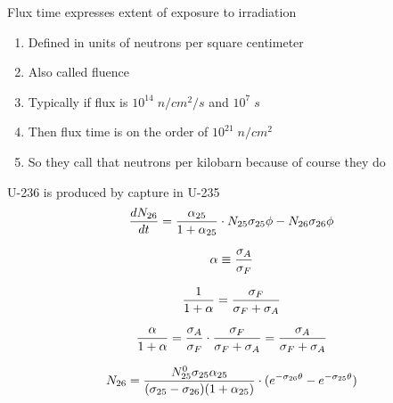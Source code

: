 \documentclass[aspectratio=1610,pdftex,dvipsnames,compress,xcolor={dvipsnames}]{beamer}
\begin{document}
\begin{frame}{Flux time expresses extent of exposure to irradiation}
    \begin{enumerate}[series=outerlist,topsep=0pt,itemsep=21pt,leftmargin=*,label=(\arabic*)]
        \item[]Defined in units of neutrons per square centimeter
        \item[]Also called fluence
        \item[]Typically if flux is $10^{14} \; n/cm^2/s$ and $10^7 \; s$
        \item[]Then flux time is on the order of $10^{21} \; n/cm^2$
        \item[]So they call that neutrons per kilobarn because of course they do
    \end{enumerate}
\end{frame}


\begin{frame}{U-236 is produced by capture in U-235}
    \begin{equation}
        \LARGE
        \frac{dN_{26}}{dt}=\frac{\alpha_{25}}{1 + \alpha_{25}}\cdot N_{25}\sigma_{25}\phi-N_{26}\sigma_{26}\phi
    \end{equation}
    
    \begin{equation}
        \LARGE
        \alpha \equiv \frac{\sigma_A}{\sigma_F}
    \end{equation}
    
    \begin{equation}
        \LARGE
        \frac{1}{1+\alpha} = \frac{\sigma_F}{\sigma_F+\sigma_A}
    \end{equation}

    \begin{equation}
        \LARGE
        \frac{\alpha}{1+\alpha}=\frac{\sigma_A}{\sigma_F} \cdot \frac{\sigma_F}{\sigma_F+\sigma_A} =\frac{\sigma_A}{\sigma_F+\sigma_A}
    \end{equation}

    \begin{equation}
        \LARGE
        N_{26}=\frac{N_{25}^0\sigma_{25}\alpha_{25}}{(\sigma_{25}-\sigma_{26})(1 + \alpha_{25})}\cdot(e^{-\sigma_{26}\theta}-e^{-\sigma_{25}\theta})
    \end{equation}
\end{frame}
\end{document}

